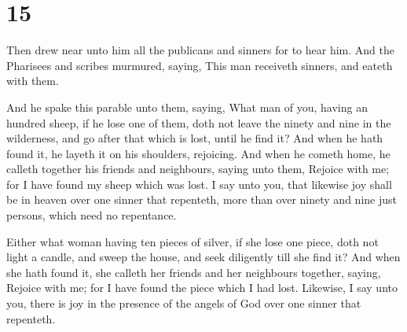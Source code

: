 \hypertarget{section-14}{%
\section{15}\label{section-14}}

 Then drew near unto him all the publicans and sinners for
to hear him.  And the Pharisees and scribes murmured,
saying, This man receiveth sinners, and eateth with them.

 And he spake this parable unto them, saying, 
What man of you, having an hundred sheep, if he lose one of them, doth
not leave the ninety and nine in the wilderness, and go after that which
is lost, until he find it?  And when he hath found it, he
layeth it on his shoulders, rejoicing.  And when he cometh
home, he calleth together his friends and neighbours, saying unto them,
Rejoice with me; for I have found my sheep which was lost. 
I say unto you, that likewise joy shall be in heaven over one sinner
that repenteth, more than over ninety and nine just persons, which need
no repentance.

 Either what woman having ten pieces of silver, if she lose
one piece, doth not light a candle, and sweep the house, and seek
diligently till she find it?  And when she hath found it,
she calleth her friends and her neighbours together, saying, Rejoice
with me; for I have found the piece which I had lost. 
Likewise, I say unto you, there is joy in the presence of the angels of
God over one sinner that repenteth.

